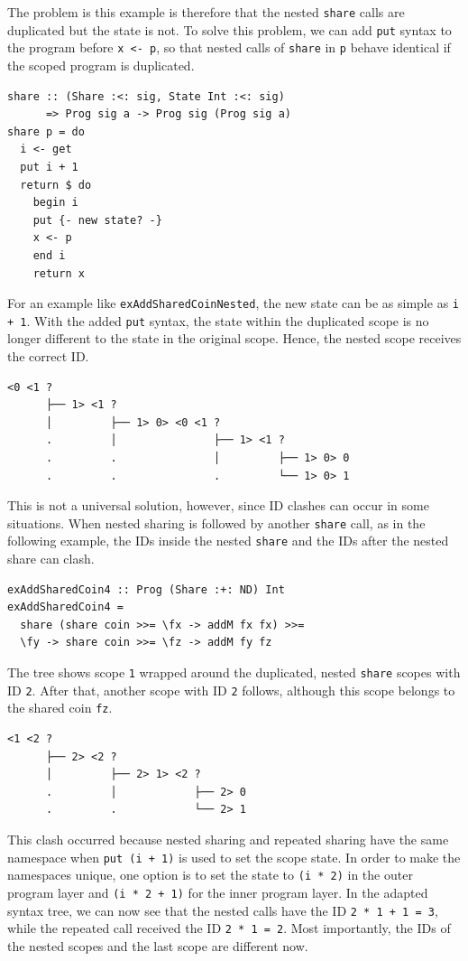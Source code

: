 \documentclass[a4paper, 11pt, fleqn, twoside]{scrreprt}
\newcommand{\hinl}[1]{\texttt{#1}}
\begin{document}
The problem is this example is therefore that the nested \hinl{share} calls are duplicated but the state is not.
To solve this problem, we can add \hinl{put} syntax to the program before \hinl{x <- p}, so that  nested calls of \hinl{share} in \hinl{p} behave identical if the scoped program is duplicated.

\begin{verbatim}
share :: (Share :<: sig, State Int :<: sig) 
      => Prog sig a -> Prog sig (Prog sig a)
share p = do
  i <- get
  put i + 1
  return $ do
    begin i
    put {- new state? -}
    x <- p
    end i
    return x
\end{verbatim}

For an example like \hinl{exAddSharedCoinNested}, the new state can be as simple as \hinl{i + 1}.
With the added \hinl{put} syntax, the state within the duplicated scope is no longer different to the state in the original scope.
Hence, the nested scope receives the correct ID.

\begin{verbatim}
<0 <1 ? 
      ├── 1> <1 ? 
      │         ├── 1> 0> <0 <1 ? 
      .         │               ├── 1> <1 ? 
      .         .               │         ├── 1> 0> 0
      .         .               .         └── 1> 0> 1
\end{verbatim}

This is not a universal solution, however, since ID clashes can occur in some situations.
When nested sharing is followed by another \hinl{share} call, as in the following example, the IDs inside the nested \hinl{share} and the IDs after the nested share can clash.

\begin{verbatim}
exAddSharedCoin4 :: Prog (Share :+: ND) Int
exAddSharedCoin4 =
  share (share coin >>= \fx -> addM fx fx) >>=
  \fy -> share coin >>= \fz -> addM fy fz
\end{verbatim}

The tree shows scope \hinl{1} wrapped around the duplicated, nested \hinl{share} scopes with ID \hinl{2}.
After that, another scope with ID \hinl{2} follows, although this scope belongs to the shared coin \hinl{fz}.

\begin{verbatim}
<1 <2 ? 
      ├── 2> <2 ? 
      │         ├── 2> 1> <2 ?
      .         │            ├── 2> 0
      .         .            └── 2> 1
\end{verbatim}

This clash occurred because nested sharing and repeated sharing have the same namespace when \hinl{put (i + 1)} is used to set the scope state.
In order to make the namespaces unique, one option is to set the state to \hinl{(i * 2)} in the outer program layer and \hinl{(i * 2 + 1)} for the inner program layer.
In the adapted syntax tree, we can now see that the nested calls have the ID \hinl{2 * 1 + 1 = 3}, while the repeated call received the ID \hinl{2 * 1 = 2}.
Most importantly, the IDs of the nested scopes and the last scope are different now.
\end{document}

